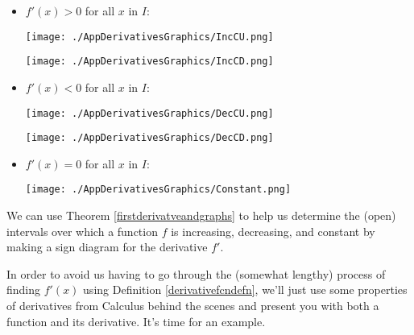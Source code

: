 \documentclass{ximera}
\begin{document}
\begin{itemize}

\item  $f'(x) > 0$  for all $x$ in $I$:

\begin{center}

\begin{multicols}{2}

\texttt{[image: ./AppDerivativesGraphics/IncCU.png]} 

\texttt{[image: ./AppDerivativesGraphics/IncCD.png]} 

\end{multicols}

\end{center}

\item  $f'(x) < 0$  for all $x$ in $I$:


\begin{center}

\begin{multicols}{2}

\texttt{[image: ./AppDerivativesGraphics/DecCU.png]} 

\texttt{[image: ./AppDerivativesGraphics/DecCD.png]} 

\end{multicols}

\end{center}


\item $f'(x) = 0$  for all $x$ in $I$:

\begin{center}

\texttt{[image: ./AppDerivativesGraphics/Constant.png]} 

\end{center}

\end{itemize}

We can use Theorem \ref{firstderivatveandgraphs} to help us determine the (open) intervals over which a function $f$ is increasing, decreasing, and constant by making a sign diagram for the derivative $f'$. 

\medskip

In order to avoid us having to go through the (somewhat lengthy) process of finding $f'(x)$ using Definition \ref{derivativefcndefn}, we'll just use some properties of derivatives from Calculus behind the scenes and present you with both a function and its derivative.  It's time for an example.
\end{document}
